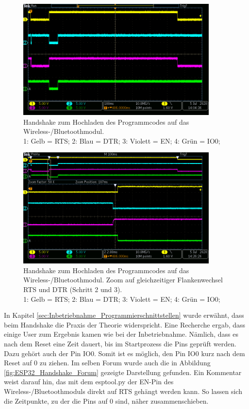 \begin{figure}[H]
\center
\includegraphics[width = 0.9\textwidth]{graphics/ESP32_RTS_DTR_EN_IO0_gesamt}
\caption{Handshake zum Hochladen des Programmcodes auf das Wireless-/Bluetoothmodul. \\\hspace{\textwidth}1: Gelb = RTS; 2: Blau = DTR; 3: Violett = EN; 4: Grün = IO0;}
\label{fig:ESP32_RTS_DTR_EN_IO0_gesamt}
\end{figure}

\begin{figure}[H]
\center
\includegraphics[width = 0.9\textwidth]{graphics/ESP32_RTS_DTR_EN_IO0_2}
\caption{Handshake zum Hochladen des Programmcodes auf das Wireless-/Bluetoothmodul. Zoom auf gleichzeitiger Flankenwechsel RTS und DTR (Schritt 2 und 3).\\\hspace{\textwidth}1: Gelb = RTS; 2: Blau = DTR; 3: Violett = EN; 4: Grün = IO0;}
\label{fig:ESP32_RTS_DTR_EN_IO0_2}
\end{figure}


In Kapitel \ref{sec:Inbetriebnahme_Programmierschnittstellen} wurde erwähnt, dass beim Handshake die Praxis der Theorie widerspricht. Eine Recherche ergab, dass einige User zum Ergebnis kamen wie bei der Inbetriebnahme. Nämlich, dass es nach dem Reset eine Zeit dauert, bis im Startprozess die Pins geprüft werden. Dazu gehört auch der Pin IO0. Somit ist es möglich, den Pin IO0 kurz nach dem Reset auf 0 zu ziehen.
Im selben Forum wurde auch die in Abbildung \ref{fig:ESP32_Handshake_Forum} gezeigte Darstellung gefunden. Ein Kommentar weist darauf hin, das mit dem esptool.py der EN-Pin des Wireless-/Bluetoothmoduls direkt auf RTS gehängt werden kann. So lassen sich die Zeitpunkte, zu der die Pins auf 0 sind, näher zusammenschieben. \cite{liudr_trying_2017}

